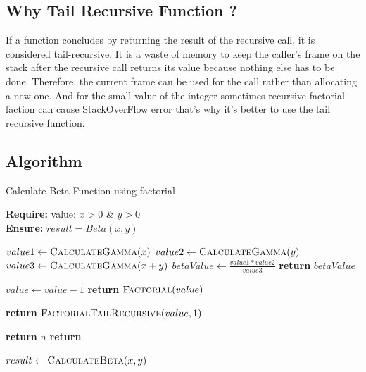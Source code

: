 \documentclass[12pt,a4paper]{report}
\begin{document}
\subsection{Why Tail Recursive Function ?}
If a function concludes by returning the result of the recursive call, it is considered tail-recursive. It is a waste of memory to keep the caller's frame on the stack after the recursive call returns its value because nothing else has to be done. Therefore, the current frame can be used for the call rather than allocating a new one. And for the small value of the integer sometimes recursive factorial faction can cause StackOverFlow error that's why it's better to use the tail recursive function. \\

\newpage
\subsection{Algorithm}

\begin{algorithm}
\caption{Calculate Beta Function using factorial}

\textbf{Require:}  value: $x > 0$ \& $y>0$  \\
\textbf{Ensure:} $result = Beta(x,y)$
\begin{algorithmic}[1]

    \State $value1 \leftarrow \Call{CalculateGamma}{x}$
    \State $value2 \leftarrow \Call{CalculateGamma}{y}$
    \State $value3 \leftarrow \Call{CalculateGamma}{x+y}$
    \State $betaValue \leftarrow \frac{value1 * value2}{value3}$
    \State \textbf{return} $betaValue$
    \EndProcedure
\Statex


    \State $value \leftarrow value-1$
    \State \textbf{return} $\Call{Factorial}{value}$ 
    \EndProcedure
\Statex

    \State \textbf{return} $\Call{FactorialTailRecursive}{value,1}$ 
    \EndProcedure
\Statex

    \State \textbf{return} $n$  
    \Else
    \State \textbf{return}  
    \EndIf
    \EndProcedure
\Statex


\State $result \leftarrow \Call{CalculateBeta}{x,y} $

\end{algorithmic}
\end{algorithm}
\end{document}
